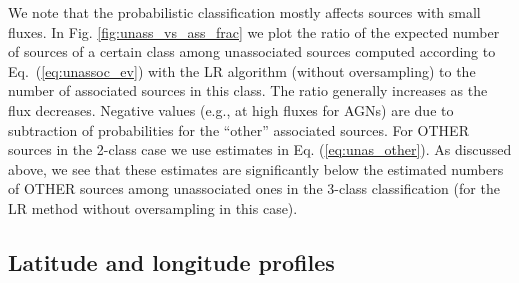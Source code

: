 We note that the probabilistic classification mostly affects sources with small fluxes.
In Fig. \ref{fig:unass_vs_ass_frac} we plot the ratio of the expected number of sources of a certain class among unassociated sources
computed according to Eq.~(\ref{eq:unassoc_ev}) with the LR algorithm (without oversampling) to the number of associated sources in this class.
The ratio generally increases as the flux decreases.
Negative values (e.g., at high fluxes for AGNs) are due to subtraction of probabilities for the ``other'' associated sources.
For OTHER sources in the 2-class case we use estimates in Eq. (\ref{eq:unas_other}).
As discussed above, we see that these estimates are significantly below the estimated numbers of OTHER sources among unassociated ones in the 3-class classification (for the LR method without oversampling in this case).


\subsection{Latitude and longitude profiles}

